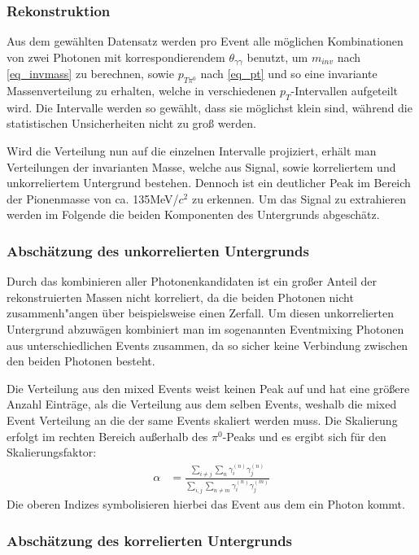\documentclass[]{article}
\begin{document}
	
	\subsubsection{Rekonstruktion}
	Aus dem gew{\"a}hlten Datensatz werden pro Event alle m{\"o}glichen Kombinationen von zwei Photonen mit korrespondierendem $\theta_{\gamma\gamma}$ benutzt, um $m_{inv}$ nach \ref{eq_invmass} zu berechnen, sowie $p_{T\pi^{0}}$ nach \ref{eq_pt} und so eine invariante Massenverteilung zu erhalten, welche in verschiedenen $p_{T}$-Intervallen aufgeteilt wird. Die Intervalle werden so gew{\"a}hlt, dass sie m{\"o}glichst klein sind, w{\"a}hrend die statistischen Unsicherheiten nicht zu gro{\ss} werden.
	
	
	Wird die Verteilung nun auf die einzelnen Intervalle projiziert, erh{\"a}lt man Verteilungen der invarianten Masse, welche aus Signal, sowie korreliertem und unkorreliertem Untergrund bestehen. Dennoch ist ein deutlicher Peak im Bereich der Pionenmasse von ca. 135MeV/$c^{2}$ zu erkennen. Um das Signal zu extrahieren werden im Folgende die beiden Komponenten des Untergrunds abgesch{\"a}tz.
	
	\subsubsection{Absch{\"a}tzung des unkorrelierten Untergrunds}
	
	Durch das kombinieren aller Photonenkandidaten ist ein gro{\ss}er Anteil der rekonstruierten Massen nicht korreliert, da die beiden Photonen nicht zusammenh{"a}ngen {\"u}ber beispielsweise einen Zerfall. Um diesen unkorrelierten Untergrund abzuw{\"a}gen kombiniert man im sogenannten Eventmixing Photonen aus unterschiedlichen Events zusammen, da so sicher keine Verbindung zwischen den beiden Photonen besteht.
	
	
	Die Verteilung aus den mixed Events weist keinen Peak auf und hat eine gr{\"o}{\ss}ere Anzahl Eintr{\"a}ge, als die Verteilung aus dem selben Events, weshalb die mixed Event Verteilung an die der same Events skaliert werden muss. Die Skalierung erfolgt im rechten Bereich au{\ss}erhalb des $\pi^{0}$-Peaks und es ergibt sich f{\"u}r den Skalierungsfaktor:
	\begin{align}
	\alpha &= \frac{\sum_{i \neq j}\sum_{n}\gamma^{(n)}_{i}\gamma^{(n)}_{j}}{\sum_{i,j}\sum_{n \neq m}\gamma^{(n)}_{i}\gamma^{(m)}_{j}}
	\end{align}
	Die oberen Indizes symbolisieren hierbei das Event aus dem ein Photon kommt. 
	\subsubsection{Absch{\"a}tzung des korrelierten Untergrunds}
\end{document}

